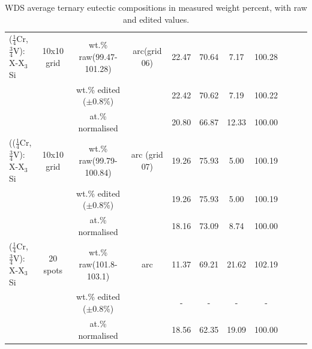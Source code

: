 \begin{landscape}
\begin{table}[htdp]
\begin{center}
\begin{tabular}{lcccccccccc}
\hline
($\frac{1}{4}$Cr, $\frac{3}{4}$V): X-X$_3$Si & 10x10 grid&wt.\% raw(99.47-101.28)&arc(grid 06) &22.47&70.64		& 7.17    	&100.28\\
			   &				   		&wt.\% edited ($\pm$0.8\%) 	& 			&	22.42		&	70.62		&  7.19		&100.22\\
			   &				   		&at.\% normalised			& 			&	20.80		&	66.87		&  12.33   	&100.00\\

(($\frac{1}{4}$Cr, $\frac{3}{4}$V): X-X$_3$Si & 10x10 grid&wt.\% raw(99.79-100.84)&arc (grid 07) &19.26		&75.93		& 5.00   	&100.19\\
			   &				   		&wt.\% edited ($\pm$0.8\%) & 					&19.26		&75.93		& 5.00   	&100.19\\
			   &				   		&at.\% normalised			& 					&18.16		&73.09		& 8.74  	&100.00\\

($\frac{1}{4}$Cr, $\frac{3}{4}$V): X-X$_3$Si & 20 spots&wt.\% raw(101.8-103.1)			&arc 		&11.37			&69.21			&21.62		&102.19	\\
			   &				   		&wt.\% edited ($\pm$0.8\%) 	& 			&-				&-				& - 		&-\\
			   &				   		&at.\% normalised			& 			&18.56			&	62.35		& 19.09    	&100.00\\
\hline
\end{tabular}
\end{center}
\caption{WDS average ternary eutectic compositions in measured weight percent, with raw and edited values.}
\label{tab:ternary}
\end{table}
\end{landscape}
%
%
%
